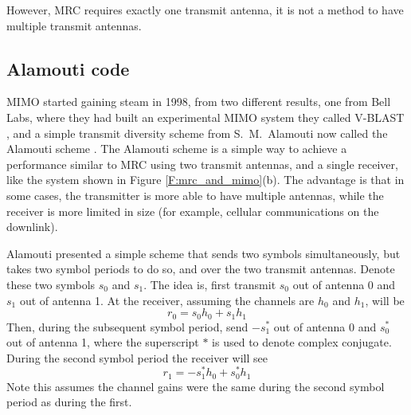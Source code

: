 However, MRC requires exactly one transmit antenna, it is not a method to have multiple transmit antennas.

\subsection{Alamouti code}

MIMO started gaining steam in 1998, from two different results, one from Bell Labs, where they had built an experimental MIMO system they called V-BLAST \cite{wolniansky1998vblast}, and a simple transmit diversity scheme from S.\ M.\ Alamouti now called the Alamouti scheme \cite{alamouti1998simple}.  The Alamouti scheme is a simple way to achieve a performance similar to MRC using two transmit antennas, and a single receiver, like the system shown in Figure \ref{F:mrc_and_mimo}(b).  The advantage is that in some cases, the transmitter is more able to have multiple antennas, while the receiver is more limited in size (for example, cellular communications on the downlink).  

Alamouti presented a simple scheme that sends two symbols simultaneously, but takes two symbol periods to do so, and over the two transmit antennas.  Denote these two symbols $s_0$ and $s_1$.  The idea is, first transmit $s_0$ out of antenna 0 and $s_1$ out of antenna 1.  At the receiver, assuming the channels are $h_0$ and $h_1$, will be
\begin{equation} \label{E:r0}
r_0 = s_0 h_0  + s_1 h_1 
\end{equation}
Then, during the subsequent symbol period, send $-s_1^*$ out of antenna 0 and $s_0^*$ out of antenna 1, where the superscript $*$ is used to denote complex conjugate.  During the second symbol period the receiver will see
\begin{equation}\label{E:r1}
r_1 = -s_1^* h_0  + s_0^* h_1 
\end{equation}
Note this assumes the channel gains were the same during the second symbol period as during the first.

